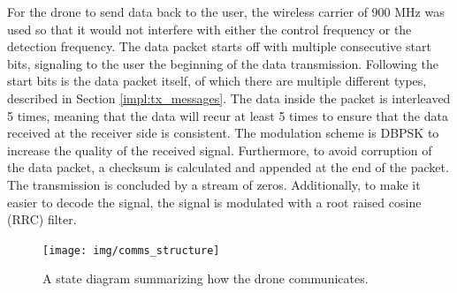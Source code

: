 For the drone to send data back to the user, the wireless carrier of 900 MHz was used so that it would not interfere with either the control frequency or the detection frequency. The data packet starts off with multiple consecutive start bits, signaling to the user the beginning of the data transmission. Following the start bits is the data packet itself, of which there are multiple different types, described in Section \ref{impl:tx_messages}. The data inside the packet is interleaved 5 times, meaning that the data will recur at least 5 times to ensure that the data received at the receiver side is consistent. The modulation scheme is DBPSK to increase the quality of the received signal.  Furthermore, to avoid corruption of the data packet, a checksum is calculated and appended at the end of the packet. The transmission is concluded by a stream of zeros. Additionally, to make it easier to decode the signal, the signal is modulated with a root raised cosine (RRC) filter. 
\begin{figure}[ht!]
	\centering
	\texttt{[image: img/comms\_structure]}
	\caption{A state diagram summarizing how the drone communicates.}
	\label{fig:comms_structure}
\end{figure}\par

